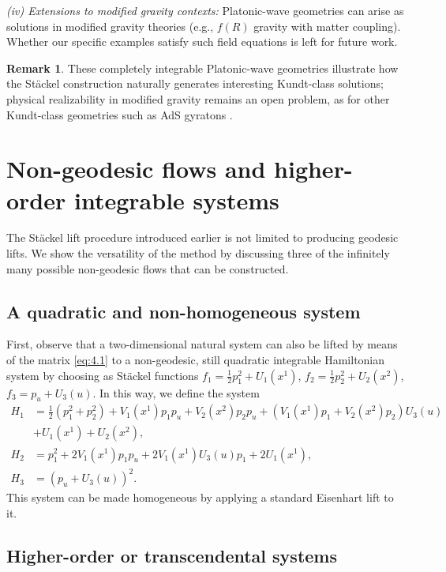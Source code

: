 \documentclass[10pt]{amsart}
\numberwithin{equation}{section}
\theoremstyle{definition}
\newtheorem{remark}{\textbf{Remark}}
\begin{document}
\textit{(iv) Extensions to modified gravity contexts:} Platonic-wave geometries can arise as solutions in modified gravity theories (e.g., $f(R)$ gravity with matter coupling). Whether our specific examples satisfy such field equations is left for future work.

\begin{remark}
	These completely integrable Platonic-wave geometries illustrate how the Stäckel construction naturally generates interesting Kundt-class solutions; physical realizability in modified gravity remains an open problem, as for other Kundt-class geometries such as AdS gyratons \cite{Frolov2005}.
\end{remark}

\section{Non-geodesic flows and higher-order integrable systems} \label{sec:7}
	
	The St\"ackel lift procedure introduced earlier is not limited to producing geodesic lifts. We show the versatility of the method by discussing three of the infinitely many possible non-geodesic flows that can be constructed.
	
	\subsection{A quadratic and non-homogeneous system}
	First, observe that a two-dimensional natural system can also be lifted by means of the matrix \eqref{eq:4.1} to a non-geodesic, still quadratic integrable Hamiltonian system by choosing as St\"ackel functions $f_1= \frac{1}{2}p_1^2 +U_1(x^1)$, $f_2=\frac{1}{2}p^{2}_{2}+U_2(x^2)$, $f_3= p_u+U_3(u)$. In this way, we define the system
	\begin{equation}
		\begin{split}
			H_1 &= \frac{1}{2}(p_1^2+p_2^2) + V_1(x^1) p_1 p_u+ V_2(x^2) p_2 p_u+ (V_1(x^1)p_1+V_2(x^2)p_2) U_3 (u) \\  &+ U_1(x^1)+U_2(x^2), \\
			H_2 &= p_1^2+2 V_1(x^1) p_1 p_u+ 2 V_1(x^1) U_3(u) p_1+ 2 U_1(x^1), \\
			H_3 &= (p_u+ U_3(u))^2.
		\end{split}
	\end{equation}
	This system can be made homogeneous by applying a standard Eisenhart lift to it.
	\subsection{Higher-order or transcendental systems}
	
\end{document}
